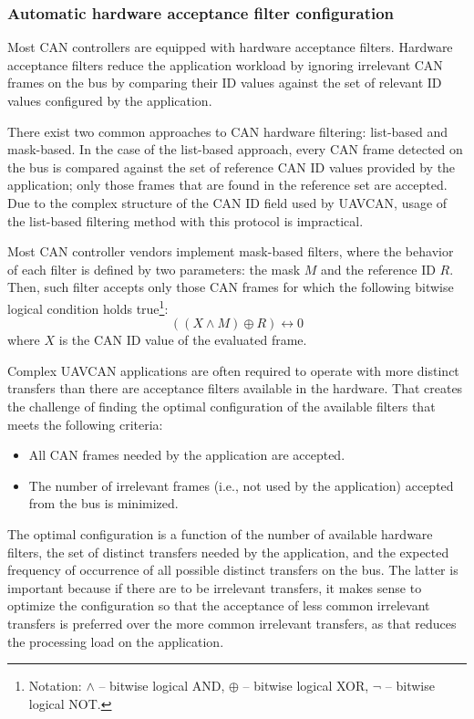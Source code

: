 \subsubsection{Automatic hardware acceptance filter configuration}

\begin{remark}[breakable]
    Most CAN controllers are equipped with hardware acceptance filters.
    Hardware acceptance filters reduce the application workload by ignoring irrelevant CAN frames on the bus
    by comparing their ID values against the set of relevant ID values configured by the application.

    There exist two common approaches to CAN hardware filtering:
    list-based and mask-based.
    In the case of the list-based approach, every CAN frame detected on the bus is compared
    against the set of reference CAN ID values provided by the application;
    only those frames that are found in the reference set are accepted.
    Due to the complex structure of the CAN ID field used by UAVCAN,
    usage of the list-based filtering method with this protocol is impractical.

    Most CAN controller vendors implement mask-based filters,
    where the behavior of each filter is defined by two parameters: the mask $M$ and the reference ID $R$.
    Then, such filter accepts only those CAN frames for which the following bitwise logical condition holds
    true\footnote{Notation: $\land$ -- bitwise logical AND, $\oplus$ -- bitwise logical XOR,
    $\neg$ -- bitwise logical NOT.}:
    $$((X \land M) \oplus R) \leftrightarrow 0$$
    where $X$ is the CAN ID value of the evaluated frame.

    Complex UAVCAN applications are often required to operate with more distinct transfers than there are
    acceptance filters available in the hardware.
    That creates the challenge of finding the optimal configuration of the available filters that meets the
    following criteria:
    \begin{itemize}
        \item All CAN frames needed by the application are accepted.
        \item The number of irrelevant frames (i.e., not used by the application) accepted from the bus is minimized.
    \end{itemize}

    The optimal configuration is a function of the number of available hardware filters,
    the set of distinct transfers needed by the application,
    and the expected frequency of occurrence of all possible distinct transfers on the bus.
    The latter is important because if there are to be irrelevant transfers,
    it makes sense to optimize the configuration so that the acceptance of less common irrelevant transfers
    is preferred over the more common irrelevant transfers, as that reduces the processing load on the application.


\end{remark}
